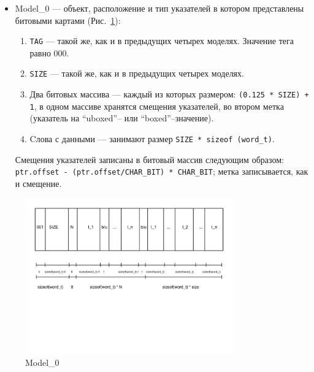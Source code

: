 \begin{itemize}
\item Model\_0 --- объект, расположение и тип указателей в котором представлены битовыми картами (Рис.~\ref{third}):
\begin{enumerate}
\item \lstinline{TAG} --- такой же, как и в предыдущих четырех моделях. Значение тега равно 000.
\item \lstinline{SIZE} --- такой же, как и в предыдущих четырех моделях.
\item Два битовых массива ---  каждый из которых размером: \lstinline{(0.125 * SIZE) + 1}, в одном массиве хранятся смещения указателей, во втором метка (указатель на ``uboxed''-- или ``boxed''--значение).
\item Cлова с данными --- занимают размер \lstinline{SIZE * sizeof (word_t)}.
\end{enumerate}
Смещения указателей записаны в битовый массив следующим образом: \lstinline{ptr.offset - (ptr.offset/CHAR_BIT) * CHAR_BIT};
метка записывается, как и смещение.
\end{itemize}
\begin{figure}[h]
\includegraphics[width=0.8\textwidth]{Kren/3}
\caption{Model\_0}
\label{third}
\end{figure}


